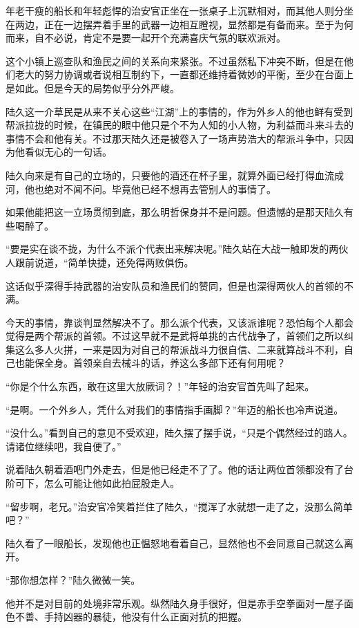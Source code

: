 年老干瘦的船长和年轻彪悍的治安官正坐在一张桌子上沉默相对，而其他人则分坐在两边，正在一边摆弄着手里的武器一边相互瞪视，显然都是有备而来。至于为何而来，自不必说，肯定不是要一起开个充满喜庆气氛的联欢派对。

这个小镇上巡查队和渔民之间的关系向来紧张。不过虽然私下冲突不断，但是在他们老大的努力协调或者说相互制约下，一直都还维持着微妙的平衡，至少在台面上是如此。但是今天的局势似乎分外严峻。

陆久这一介草民是从来不关心这些“江湖”上的事情的，作为外乡人的他也鲜有受到帮派拉拢的时候，在镇民的眼中他只是个不为人知的小人物，为利益而斗来斗去的事情不会和他有关。不过那天陆久还是被卷入了一场声势浩大的帮派斗争中，只因为他看似无心的一句话。

陆久向来是有自己的立场的，只要他的酒还在杯子里，就算外面已经打得血流成河，他也绝对不闻不问。毕竟他已经不想再去管别人的事情了。

如果他能把这一立场贯彻到底，那么明哲保身并不是问题。但遗憾的是那天陆久有些喝醉了。

“要是实在谈不拢，为什么不派个代表出来解决呢。”陆久站在大战一触即发的两伙人跟前说道，“简单快捷，还免得两败俱伤。

这话似乎深得手持武器的治安队员和渔民们的赞同，但是也深得两伙人的首领的不满。

今天的事情，靠谈判显然解决不了。那么派个代表，又该派谁呢？恐怕每个人都会觉得是两个帮派的首领。不过这早就不是武将单挑的古代战争了，首领们之所以纠集这么多人火拼，一来是因为对自己的帮派战斗力很自信、二来就算战斗不利，自己也能保全身。首领亲自去械斗的话，养这么多部下还有何用呢？

“你是个什么东西，敢在这里大放厥词？！”年轻的治安官首先叫了起来。

“是啊。一个外乡人，凭什么对我们的事情指手画脚？”年迈的船长也冷声说道。

“没什么。”看到自己的意见不受欢迎，陆久摆了摆手说，“只是个偶然经过的路人。请诸位继续吧，我自便了。”

说着陆久朝着酒吧门外走去，但是他已经走不了了。他的话让两位首领都没有了台阶可下，怎么可能让他如此拍屁股走人。

“留步啊，老兄。”治安官冷笑着拦住了陆久，“搅浑了水就想一走了之，没那么简单吧？”

陆久看了一眼船长，发现他也正愠怒地看着自己，显然他也不会同意自己就这么离开。

“那你想怎样？”陆久微微一笑。

他并不是对目前的处境非常乐观。纵然陆久身手很好，但是赤手空拳面对一屋子面色不善、手持凶器的暴徒，他没有什么正面对抗的把握。

